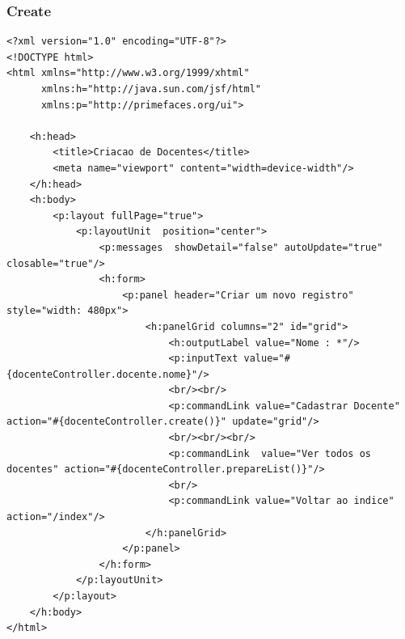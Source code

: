 \documentclass[12pt,a4paper]{article}
\begin{document}
\subsubsection{Create}
\label{subsubsectionDocenteCreate}
\begin{lstlisting}
<?xml version="1.0" encoding="UTF-8"?>
<!DOCTYPE html>
<html xmlns="http://www.w3.org/1999/xhtml"
      xmlns:h="http://java.sun.com/jsf/html"
      xmlns:p="http://primefaces.org/ui">

    <h:head>
        <title>Criacao de Docentes</title>
        <meta name="viewport" content="width=device-width"/>
    </h:head>
    <h:body>
        <p:layout fullPage="true"> 
            <p:layoutUnit  position="center">
                <p:messages  showDetail="false" autoUpdate="true" closable="true"/>
                <h:form>
                    <p:panel header="Criar um novo registro" style="width: 480px">  
                        <h:panelGrid columns="2" id="grid">  
                            <h:outputLabel value="Nome : *"/>  
                            <p:inputText value="#{docenteController.docente.nome}"/>
                            <br/><br/>
                            <p:commandLink value="Cadastrar Docente" action="#{docenteController.create()}" update="grid"/>
                            <br/><br/><br/>
                            <p:commandLink  value="Ver todos os docentes" action="#{docenteController.prepareList()}"/>
                            <br/>
                            <p:commandLink value="Voltar ao indice" action="/index"/>
                        </h:panelGrid>
                    </p:panel>
                </h:form>
            </p:layoutUnit>
        </p:layout>
    </h:body>
</html>
\end{lstlisting}
\end{document}
